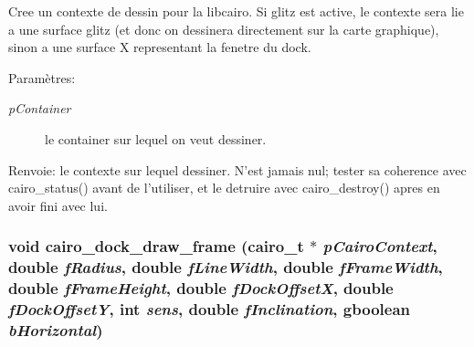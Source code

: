 Cree un contexte de dessin pour la libcairo. Si glitz est active, le contexte sera lie a une surface glitz (et donc on dessinera directement sur la carte graphique), sinon a une surface X representant la fenetre du dock. \begin{Desc}
\item[Paramètres:]
\begin{description}
\item[{\em pContainer}]le container sur lequel on veut dessiner. \end{description}
\end{Desc}
\begin{Desc}
\item[Renvoie:]le contexte sur lequel dessiner. N'est jamais nul; tester sa coherence avec cairo\_\-status() avant de l'utiliser, et le detruire avec cairo\_\-destroy() apres en avoir fini avec lui. \end{Desc}
\subsubsection{\setlength{\rightskip}{0pt plus 5cm}void cairo\_\-dock\_\-draw\_\-frame (cairo\_\-t $\ast$ {\em pCairoContext}, double {\em fRadius}, double {\em fLineWidth}, double {\em fFrameWidth}, double {\em fFrameHeight}, double {\em fDockOffsetX}, double {\em fDockOffsetY}, int {\em sens}, double {\em fInclination}, gboolean {\em bHorizontal})}\label{cairo-dock-draw_8h_4c114b58259893749f206d02ba419da9}


